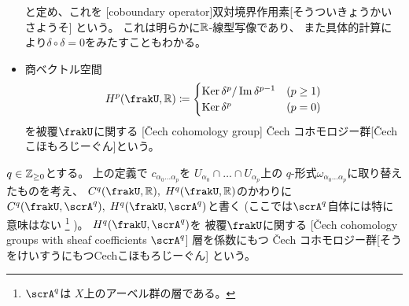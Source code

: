 \documentclass[report]{jlreq}
\begin{document}
\begin{definition}
\begin{itemize}
            と定め、これを
            [coboundary operator]{双対境界作用素}[そうついきょうかいさようそ]
            という。
            これは明らかに$\mathbb{R}$-線型写像であり、
            また具体的計算により$\delta \circ \delta = 0$をみたすこともわかる。
        \item 商ベクトル空間
            \begin{equation}
                H^p(\frakU, \R)
                    \coloneqq \begin{cases}
                        \Ker \delta^{p} / \Im \delta^{p - 1} & (p \ge 1) \\
                        \Ker \delta^{p} & (p = 0)
                    \end{cases}
            \end{equation}
            を被覆$\frakU$に関する
            [\v{C}ech cohomology group]
            {\v{C}ech コホモロジー群}[\v{C}ech こほもろじーぐん]という。
    \end{itemize}
\end{definition}


\begin{definition}
    $q \in \mathbb{Z}_{\ge 0}$とする。
    上の定義で
    $c_{\alpha_0 \dots \alpha_p}$を
    $U_{\alpha_0} \cap \dots \cap U_{\alpha_p}$上の
    $q$-形式$\omega_{\alpha_0 \dots \alpha_p}$に取り替えたものを考え、
    $C^q(\frakU, \R), \; H^q(\frakU, \R)$のかわりに
    $C^q(\frakU, \scrA^q), \; H^q(\frakU, \scrA^q)$と書く
    (ここでは$\scrA^q$自体には特に意味はない
    \footnote{
        $\scrA^q$は
        $X$上のアーベル群の層である。
    }
    )。
    $H^q(\frakU, \scrA^q)$を
    被覆$\frakU$に関する
    [\v{C}ech cohomology groups with sheaf coefficients $\scrA^q$]
    {層を係数にもつ \v{C}ech コホモロジー群}[そうをけいすうにもつCechこほもろじーぐん]
    という。
\end{definition}
\end{document}
